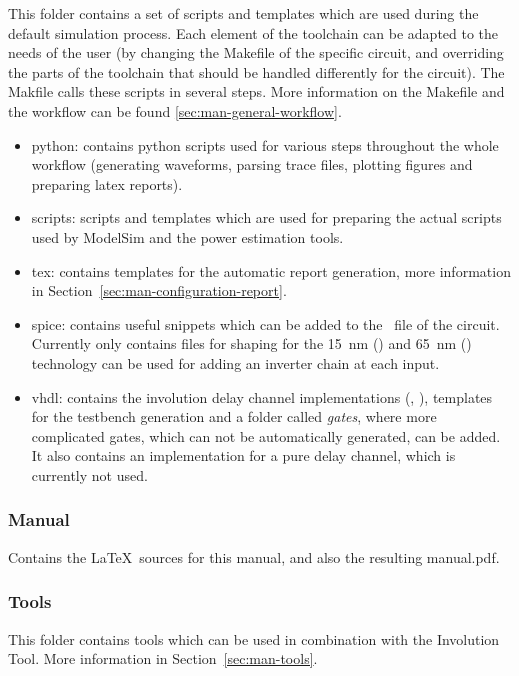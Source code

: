 This folder contains a set of scripts and templates which are used
during the default simulation process. Each element of the toolchain can
be adapted to the needs of the user (by changing the Makefile of the
specific circuit, and overriding the parts of the toolchain that should
be handled differently for the circuit). The Makfile calls these scripts
in several steps. More information on the Makefile and the workflow can
be found \ref{sec:man-general-workflow}.

\begin{itemize}
\item
  python: contains python scripts used for various steps throughout the
  whole workflow (generating waveforms, parsing trace files, plotting
  figures and preparing latex reports).
\item
  scripts: scripts and templates which are used for preparing the actual
  scripts used by ModelSim and the power estimation tools.
\item
  tex: contains templates for the automatic report generation, more
  information in Section~\ref{sec:man-configuration-report}.
\item
  spice: contains useful snippets which can be added to the \spfile\ file of 
  the circuit. Currently only contains files for shaping for the \SI{15}{\nm} 
  () and \SI{65}{\nm} () technology can be used for 
  adding an inverter chain at each input.
\item
  vhdl: contains the involution delay channel implementations (\expchannel, 
  \hillchannel), templates for the testbench generation and a folder called 
  \emph{gates}, where  more complicated gates, which can not be automatically 
  generated, can be added. It also contains an implementation for a pure delay 
  channel, which is currently not used.
\end{itemize}

\begin{comment}
\subsubsection{Manuals}
\label{sec:man-stuc-experiment-manuals}

Most of the manuals in this folder are for HSPICE. Unfortunately there
are no real manuals for Design Compiler and PrimeTime, so the user has to stick 
with the man pages.
\end{comment}

\subsubsection{Manual}
\label{sec:man-stuc-experiment-manual}
Contains the \LaTeX\ sources for this manual, and also the 
resulting manual.pdf.

\subsubsection{Tools}
\label{sec:man-stuc-experiment-tools}

This folder contains tools which can be used in combination with the
Involution Tool. More information in Section~\ref{sec:man-tools}.